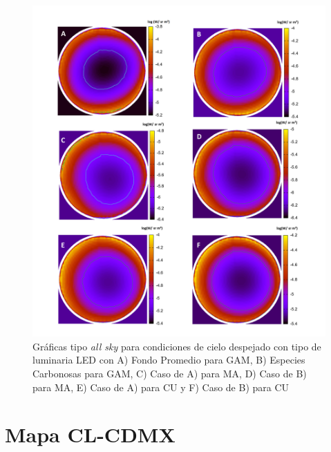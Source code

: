 \begin{figure}[H]
  \centering
    \includegraphics[width=1\textwidth]{8}
  \caption{Gráficas tipo \textit{all sky} para condiciones de cielo despejado con tipo de luminaria LED con A) Fondo Promedio para GAM, B) Especies Carbonosas para GAM, C) Caso de A) para MA, D) Caso de B) para MA, E) Caso de A) para CU y F) Caso de B) para CU} 
  \label{1}
\end{figure}

\newpage

\section{Mapa CL-CDMX}
\label{sec:mapacl}

